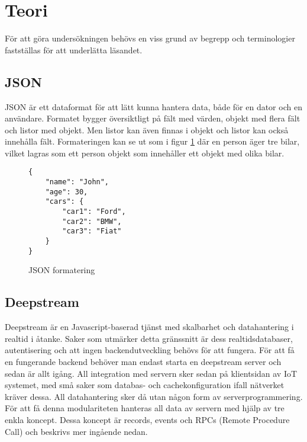 \section{Teori}

\label{sec:tim-theory}
För att göra undersökningen behövs en viss grund av begrepp och terminologier fastställas för att underlätta läsandet.

\subsection{JSON}
JSON\cite{json} är ett dataformat för att lätt kunna hantera data, både för en dator och en användare. Formatet bygger översiktligt på fält med värden, objekt med flera fält och listor med objekt. Men listor kan även finnas i objekt och listor kan också innehålla fält. Formateringen kan se ut som i figur \ref{fig:tim-jsonformat} där en person äger tre bilar, vilket lagras som ett person objekt som innehåller ett objekt med olika bilar.

\lstset{language=Java}
\begin{figure}[h]
  \begin{minipage}[c]{5cm}
    \begin{lstlisting}
{
    "name": "John",
    "age": 30,
    "cars": {
        "car1": "Ford",
        "car2": "BMW",
        "car3": "Fiat"
    }
} 
    \end{lstlisting}
  \caption{JSON formatering}
  \label{fig:tim-jsonformat}
  \end{minipage}
\end{figure}

\subsection{Deepstream}
\label{subsec:tim-deepstream}
Deepstream är en Javascript-baserad tjänst med skalbarhet och datahantering i realtid i åtanke. Saker som utmärker detta gränssnitt är dess realtidsdatabaser, autentisering och att ingen backendutveckling behövs för att fungera. För att få en fungerande backend behöver man endast starta en deepstream server och sedan är allt igång. All integration med servern sker sedan på klientsidan av IoT systemet, med små saker som databas- och cachekonfiguration ifall nätverket kräver dessa. All datahantering sker då utan någon form av serverprogrammering. För att få denna modulariteten hanteras all data av servern med hjälp av tre enkla koncept. Dessa koncept är records, events och RPCs (Remote Procedure Call) och beskrivs mer ingående nedan. 

